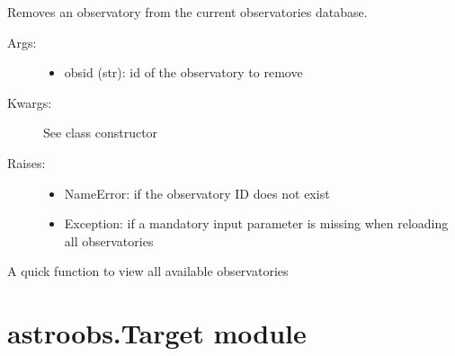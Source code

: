 \documentclass[letterpaper,10pt,english]{sphinxmanual}
\begin{document}
\begin{fulllineitems}
\begin{fulllineitems}
\label{astroobs:astroobs.ObservatoryList.ObservatoryList.rem}
Removes an observatory from the current observatories database.
\begin{description}
\item[{Args:}] \leavevmode\begin{itemize}
\item {} 
obsid (str): id of the observatory to remove

\end{itemize}

\item[{Kwargs:}] \leavevmode
See class constructor

\item[{Raises:}] \leavevmode\begin{itemize}
\item {} 
NameError: if the observatory ID does not exist

\item {} 
Exception: if a mandatory input parameter is missing when reloading all observatories

\end{itemize}

\end{description}

\end{fulllineitems}


\end{fulllineitems}


\begin{fulllineitems}
\label{astroobs:astroobs.ObservatoryList.showall}
A quick function to view all available observatories

\end{fulllineitems}



\section{astroobs.Target module}
\label{astroobs:astroobs-target-module}\label{astroobs:module-astroobs.Target}
\end{document}
